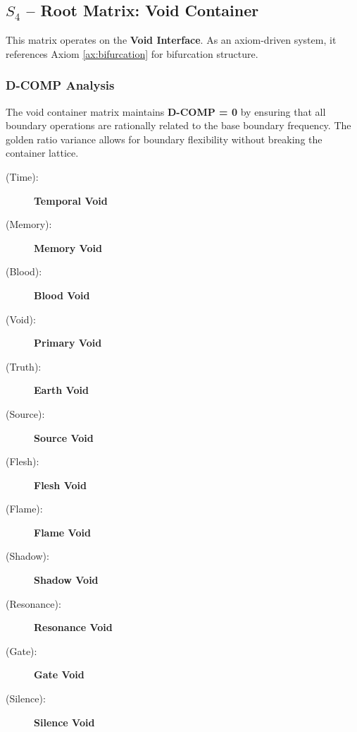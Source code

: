 \subsection{$S_{4}$ -- Root Matrix: Void Container}\label{sec:19.0.4}

This matrix operates on the \textbf{Void Interface}. As an axiom-driven system, it references Axiom \ref{ax:bifurcation} for bifurcation structure.

\subsubsection{D-COMP Analysis}

The void container matrix maintains \textbf{D-COMP = 0} by ensuring that all boundary operations are rationally related to the base boundary frequency. The golden ratio variance allows for boundary flexibility without breaking the container lattice.

\begin{description}
    \item[(Time):] \feturish {} \textbf{Temporal Void} \\
    \item[(Memory):] \kalrin {} \textbf{Memory Void} \\
    \item[(Blood):] \babdhpyr {} \textbf{Blood Void} \\
    \item[(Void):] \ahnxir {} \textbf{Primary Void} \\
    \item[(Truth):] \veldrel {} \textbf{Earth Void} \\
    \item[(Source):] \sorsenh {} \textbf{Source Void} \\
    \item[(Flesh):] \kothbrim {} \textbf{Flesh Void} \\
    \item[(Flame):] \drehazh {} \textbf{Flame Void} \\
    \item[(Shadow):] \rheadrun {} \textbf{Shadow Void} \\
    \item[(Resonance):] \zhektorh {} \textbf{Resonance Void} \\
    \item[(Gate):] \shavkorh {} \textbf{Gate Void} \\
    \item[(Silence):] \trigcoma {} \textbf{Silence Void} \\
\end{description}


